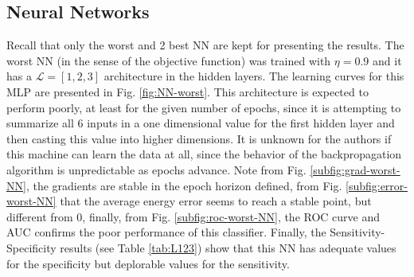 \documentclass[conference]{IEEEtran}
\theoremstyle{definition}
\theoremstyle{remark}
\theoremstyle{remark}
\begin{document}
\subsection{Neural Networks}
Recall that only the worst and 2 best NN are kept for presenting the results.
The worst NN (in the sense of the objective function) was trained with
$\eta=0.9$ and it has a $\mathcal{L}=[1,2,3]$ architecture in the hidden layers.
The learning curves for this MLP are presented in Fig. \ref{fig:NN-worst}. This
architecture is expected to perform poorly, at least for the given number of
epochs, since it is attempting to summarize all 6 inputs in a one dimensional
value for the first hidden layer and then casting this value into higher
dimensions. It is unknown for the authors if this machine can learn the data at
all, since the behavior of the backpropagation algorithm is unpredictable as
epochs advance. Note from Fig. \ref{subfig:grad-worst-NN}, the gradients are
stable in the epoch horizon defined, from Fig. \ref{subfig:error-worst-NN} that
the average energy error seems to reach a stable point, but different from 0,
finally, from Fig. \ref{subfig:roc-worst-NN}, the ROC curve and AUC confirms the
poor performance of this classifier. Finally, the Sensitivity-Specificity
results (see Table \ref{tab:L123}) show that this NN has adequate values for the
specificity but deplorable values for the sensitivity.
\end{document}
